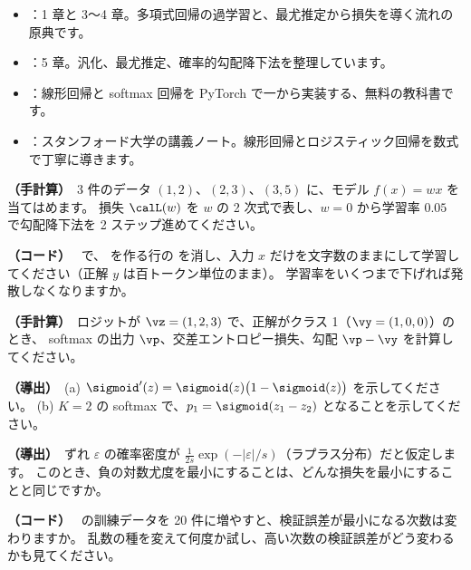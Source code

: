 \begin{itemize}
\item \cite{bishop2006prml}：1 章と 3〜4 章。多項式回帰の過学習と、最尤推定から損失を導く流れの原典です。
\item \cite{goodfellow2016deep}：5 章。汎化、最尤推定、確率的勾配降下法を整理しています。
\item \cite{zhang2023d2l}：線形回帰と softmax 回帰を PyTorch で一から実装する、無料の教科書です。
\item \cite{cs229notes}：スタンフォード大学の講義ノート。線形回帰とロジスティック回帰を数式で丁寧に導きます。
\end{itemize}

\begin{exercises}
\item \textbf{（手計算）}\ 3 件のデータ $(1,2)$、$(2,3)$、$(3,5)$ に、モデル $f(x)=wx$ を当てはめます。
損失 $\calL(w)$ を $w$ の 2 次式で表し、$w=0$ から学習率 $0.05$ で勾配降下法を 2 ステップ進めてください。
\item\label{ex:ml-scale} \textbf{（コード）}\  で、 を作る行の  を消し、入力 $x$ だけを文字数のままにして学習してください（正解 $y$ は百トークン単位のまま）。
学習率をいくつまで下げれば発散しなくなりますか。
\item \textbf{（手計算）}\ ロジットが $\vz=(1,2,3)$ で、正解がクラス 1（$\vy=(1,0,0)$）のとき、
softmax の出力 $\vp$、交差エントロピー損失、勾配 $\vp-\vy$ を計算してください。
\item\label{ex:ml-sigmoid} \textbf{（導出）}\ (a) $\sigmoid'(z)=\sigmoid(z)\bigl(1-\sigmoid(z)\bigr)$ を示してください。
(b) $K=2$ の softmax で、$p_1 = \sigmoid(z_1 - z_2)$ となることを示してください。
\item\label{ex:ml-laplace} \textbf{（導出）}\ ずれ $\varepsilon$ の確率密度が $\frac{1}{2s}\exp(-|\varepsilon|/s)$（ラプラス分布）だと仮定します。
このとき、負の対数尤度を最小にすることは、どんな損失を最小にすることと同じですか。
\item \textbf{（コード）}\  の訓練データを 20 件に増やすと、検証誤差が最小になる次数は変わりますか。
乱数の種を変えて何度か試し、高い次数の検証誤差がどう変わるかも見てください。
\end{exercises}
